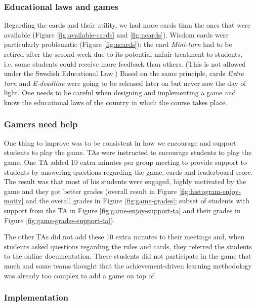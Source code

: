 \documentclass[sigconf]{acmart}
\begin{document}
\subsubsection*{Educational laws and games}

Regarding the cards and their utility, we had more cards than the ones
that were available (Figure \ref{fig:available-cards} and
\ref{fig:ncards}). Wisdom cards were particularly problematic (Figure
\ref{fig:ncards}): the card \emph{Mini-turn} had to be retired after the
second week due to its potential unfair treatment to students, i.e. some
students could receive more feedback than others. (This is not allowed
under the Swedish Educational Law.) Based on the same principle, cards
\emph{Extra turn} and \emph{E-deadline} were going to be released later
on but never saw the day of light. One needs to be careful when
designing and implementing a game and know the educational laws of the
country in which the course takes place.

\hypertarget{gamers-need-help}{%
\subsubsection*{Gamers need help}\label{gamers-need-help}}

One thing to improve was to be consistent in how we encourage and
support students to play the game. TAs were instructed to encourage
students to play the game. One TA added 10 extra minutes per group
meeting to provide support to students by answering questions regarding
the game, cards and leaderboard score. The result was that most of his
students were engaged, highly motivated by the game and they got better
grades (overall result in Figure \ref{fig:histogram-enjoy-motiv} and the
overall grades in Figure \ref{fig:game-grades}; subset of students with
support from the TA in Figure \ref{fig:game-enjoy-support-ta} and their
grades in Figure \ref{fig:game-grades-support-ta}).

The other TAs did not add these 10 extra minutes to their meetings and,
when students asked questions regarding the rules and cards, they
referred the students to the online documentation. These students did
not participate in the game that much and some teams thought that the
achievement-driven learning methodology was already too complex to add a
game on top of.

\hypertarget{implementation}{%
\subsubsection*{Implementation}\label{implementation}}
\end{document}
